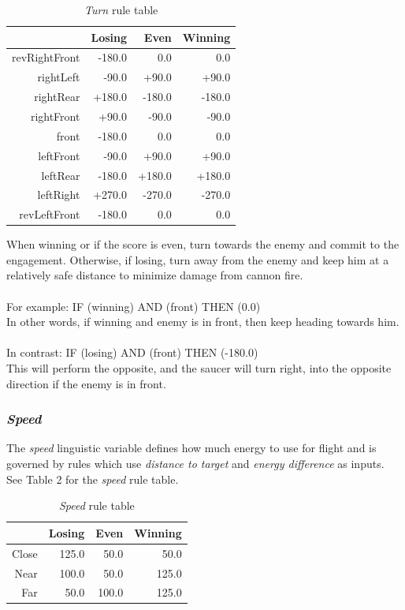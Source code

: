 \begin{table}[H]
\centering
\caption{\emph{Turn} rule table}
\label{Turn rule table}
\begin{tabular}{r|r|r|r}
 				& Losing 	& Even 		& Winning 	\\ \hline
revRightFront	& -180.0	& 0.0		& 0.0 		\\
rightLeft		& -90.0		& +90.0		& +90.0		\\
rightRear		& +180.0	& -180.0	& -180.0 	\\
rightFront		& +90.0		& -90.0 	& -90.0 	\\
front 			& -180.0	& 0.0 		& 0.0 		\\
leftFront 		& -90.0		& +90.0 	& +90.0		\\
leftRear 		& -180.0	& +180.0 	& +180.0 	\\
leftRight 		& +270.0	& -270.0 	& -270.0 	\\
revLeftFront 	& -180.0	& 0.0 		& 0.0 		\\
\end{tabular}
\end{table}

When winning or if the score is even, turn towards the enemy and commit to the engagement. Otherwise, if losing, turn away from the enemy and keep him at a relatively safe distance to minimize damage from cannon fire.
\\
\\
For example: IF (winning) AND (front) THEN (0.0)
\\
In other words, if winning and enemy is in front, then keep heading towards him.
\\
\\
In contrast: IF (losing) AND (front) THEN (-180.0)
\\
This will perform the opposite, and the saucer will turn right, into the opposite direction if the enemy is in front.

\subsubsection{\emph{Speed}}

The \emph{speed} linguistic variable defines how much energy to use for flight and is governed by rules which use \emph{distance to target} and \emph{energy difference} as inputs. See Table 2 for the \emph{speed} rule table.

\begin{table}[H]
\centering
\caption{\emph{Speed} rule table}
\label{Speed rule table}
\begin{tabular}{r|r|r|r}
 		& Losing & Even & Winning \\ \hline
Close	& 125.0 & 50.0 	& 50.0 \\
Near	& 100.0 & 50.0 	& 125.0 \\
Far		& 50.0 	& 100.0 & 125.0 \\
\end{tabular}
\end{table}

